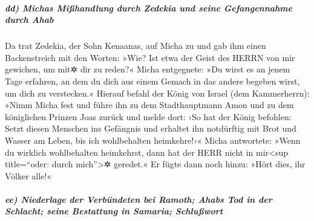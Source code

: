\hypertarget{dd-michas-miuxdfhandlung-durch-zedekia-und-seine-gefangennahme-durch-ahab}{%
\subparagraph{dd) Michas Mißhandlung durch Zedekia und seine
Gefangennahme durch
Ahab}\label{dd-michas-miuxdfhandlung-durch-zedekia-und-seine-gefangennahme-durch-ahab}}

Da trat Zedekia, der Sohn Kenaanas, auf Micha zu und gab
ihm einen Backenstreich mit den Worten: »Wie? Ist etwa der Geist des
HERRN von mir gewichen, um mit✲ dir zu reden?« Micha
entgegnete: »Du wirst es an jenem Tage erfahren, an dem du dich aus
einem Gemach in das andere begeben wirst, um dich zu verstecken.«
Hierauf befahl der König von Israel (dem Kammerherrn):
»Nimm Micha fest und führe ihn zu dem Stadthauptmann Amon und zu dem
königlichen Prinzen Joas zurück und melde dort: ›So hat
der König befohlen: Setzt diesen Menschen ins Gefängnis und erhaltet ihn
notdürftig mit Brot und Wasser am Leben, bis ich wohlbehalten
heimkehre!‹« Micha antwortete: »Wenn du wirklich
wohlbehalten heimkehrst, dann hat der HERR nicht in mir\textless sup
title=``oder: durch mich''\textgreater✲ geredet.« Er fügte dann noch
hinzu: »Hört dies, ihr Völker alle!«

\hypertarget{ee-niederlage-der-verbuxfcndeten-bei-ramoth-ahabs-tod-in-der-schlacht-seine-bestattung-in-samaria-schluuxdfwort}{%
\subparagraph{ee) Niederlage der Verbündeten bei Ramoth; Ahabs Tod in
der Schlacht; seine Bestattung in Samaria;
Schlußwort}\label{ee-niederlage-der-verbuxfcndeten-bei-ramoth-ahabs-tod-in-der-schlacht-seine-bestattung-in-samaria-schluuxdfwort}}


